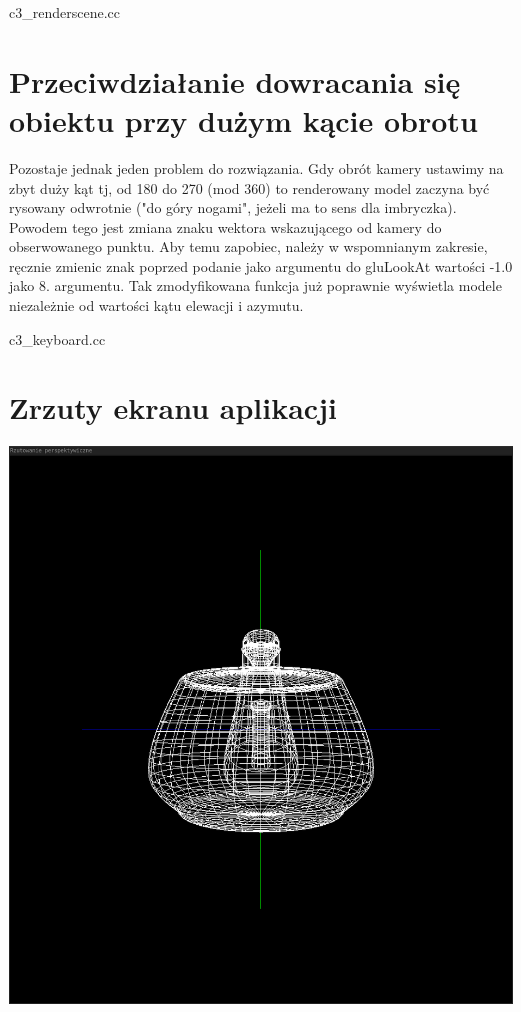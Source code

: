 \documentclass[polish,polish,a4paper]{report}
\begin{document}
\pagebreak

{c3_renderscene.cc}

\pagebreak

\section{Przeciwdziałanie dowracania się obiektu przy dużym kącie obrotu}
Pozostaje jednak jeden problem do rozwiązania. Gdy obrót kamery ustawimy na zbyt duży kąt tj, od 180 do 270 (mod 360) to renderowany model zaczyna być
rysowany odwrotnie ("do góry nogami", jeżeli ma to sens dla imbryczka). Powodem tego jest zmiana znaku wektora wskazującego od kamery do obserwowanego
punktu. Aby temu zapobiec, należy w wspomnianym zakresie, ręcznie zmienic znak poprzed podanie jako argumentu do gluLookAt wartości -1.0 jako 8.
argumentu. Tak zmodyfikowana funkcja już poprawnie wyświetla modele niezależnie od wartości kątu elewacji i azymutu.


{c3_keyboard.cc}

\pagebreak

\section{Zrzuty ekranu aplikacji}
\begin{center}
\includegraphics[width=\textwidth=2]{imbryk1}
\end{center}
\end{document}
